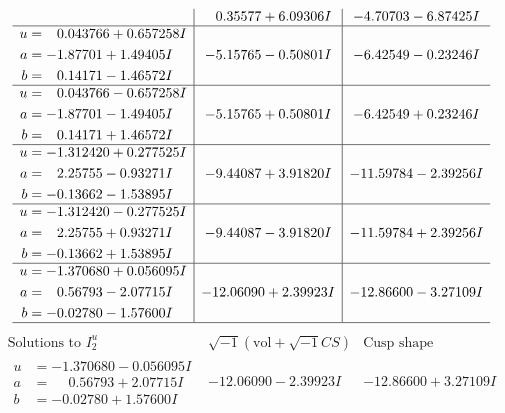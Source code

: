 \documentclass[1p]{elsarticle_modified}
\theoremstyle{definition}
\newcommand{\I}{\sqrt{-1}}
\begin{document}
$$\begin{array}{c|c|c}
 & \phantom{-}0.35577 + 6.09306 I & -4.70703 - 6.87425 I \\ \hline\begin{aligned}
u &= \phantom{-}0.043766 + 0.657258 I \\
a &= -1.87701 + 1.49405 I \\
b &= \phantom{-}0.14171 - 1.46572 I\end{aligned}
 & -5.15765 - 0.50801 I & -6.42549 - 0.23246 I \\ \hline\begin{aligned}
u &= \phantom{-}0.043766 - 0.657258 I \\
a &= -1.87701 - 1.49405 I \\
b &= \phantom{-}0.14171 + 1.46572 I\end{aligned}
 & -5.15765 + 0.50801 I & -6.42549 + 0.23246 I \\ \hline\begin{aligned}
u &= -1.312420 + 0.277525 I \\
a &= \phantom{-}2.25755 - 0.93271 I \\
b &= -0.13662 - 1.53895 I\end{aligned}
 & -9.44087 + 3.91820 I & -11.59784 - 2.39256 I \\ \hline\begin{aligned}
u &= -1.312420 - 0.277525 I \\
a &= \phantom{-}2.25755 + 0.93271 I \\
b &= -0.13662 + 1.53895 I\end{aligned}
 & -9.44087 - 3.91820 I & -11.59784 + 2.39256 I \\ \hline\begin{aligned}
u &= -1.370680 + 0.056095 I \\
a &= \phantom{-}0.56793 - 2.07715 I \\
b &= -0.02780 - 1.57600 I\end{aligned}
 & -12.06090 + 2.39923 I & -12.86600 - 3.27109 I\\
 \hline 
 \end{array}$$\newpage$$\begin{array}{c|c|c}  
\text{Solutions to }I^u_{2}& \I (\text{vol} + \sqrt{-1}CS) & \text{Cusp shape}\\
 \hline 
\begin{aligned}
u &= -1.370680 - 0.056095 I \\
a &= \phantom{-}0.56793 + 2.07715 I \\
b &= -0.02780 + 1.57600 I\end{aligned}
 & -12.06090 - 2.39923 I & -12.86600 + 3.27109 I \\ \hline\begin{aligned}

\end{aligned}
\end{array}$$
\end{document}
